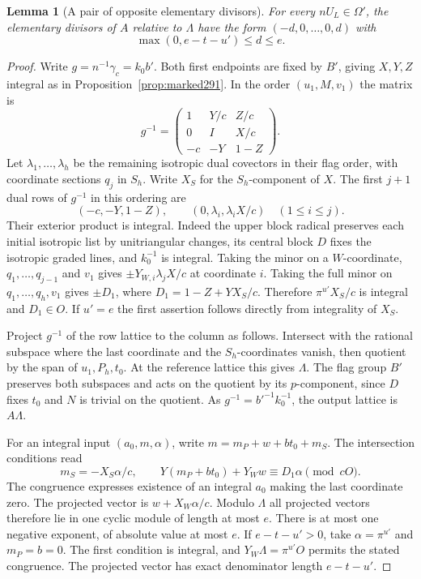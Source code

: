 \documentclass[a4paper,11pt]{article}
\newtheorem{lemma}[proposition]{Lemma}
\theoremstyle{definition}
\theoremstyle{remark}
\numberwithin{equation}{section}
\begin{document}
\begin{lemma}[A pair of opposite elementary divisors]\leavevmode
\label{lem:graphdepth293}
For every \(nU_L\in\Omega'\), the elementary divisors of
\(A\) relative to \(\Lambda\) have the form
\((-d,0,\ldots,0,d)\) with
\[
                \max(0,e-t-u')\le d\le e .
\]
\end{lemma}
\begin{proof}
Write \(g=n^{-1}\gamma_c=k_0 b'\). Both first endpoints
are fixed by \(B'\), giving \(X,Y,Z\) integral as in
Proposition~\ref{prop:marked291}. In the order
\((u_1,M,v_1)\) the matrix is
\[
   g^{-1}=\begin{pmatrix}
       1&Y/c&Z/c\\ 0&I&X/c\\ -c&-Y&1-Z
   \end{pmatrix}.
\]
Let \(\lambda_1,\ldots,\lambda_h\) be the remaining
isotropic dual covectors in their flag order, with
coordinate sections \(q_j\) in \(S_h\). Write \(X_S\)
for the \(S_h\)-component of \(X\). The first \(j+1\)
dual rows of \(g^{-1}\) in this ordering are
\[
 (-c,-Y,1-Z),\qquad (0,\lambda_i,\lambda_i X/c)
                       \quad (1\le i\le j).
\]
Their exterior product is integral. Indeed the upper
block radical preserves each initial isotropic list by
unitriangular changes, its central block \(D\) fixes the
isotropic graded lines, and \(k_0^{-1}\) is integral.
Taking the minor on a \(W\)-coordinate, \(q_1,\ldots,q_{j-1}\)
and \(v_1\) gives \(\pm Y_{W,i}\lambda_j X/c\) at
coordinate \(i\). Taking the full minor on
\(q_1,\ldots,q_h,v_1\) gives \(\pm D_1\), where
\(D_1=1-Z+Y X_S/c\). Therefore
\(\pi^{u'}X_S/c\) is integral and \(D_1\in O\). If
\(u'=e\) the first assertion follows directly from
integrality of \(X_S\).

Project \(g^{-1}\) of the row lattice to the column as
follows. Intersect with the rational subspace where the
last coordinate and the \(S_h\)-coordinates vanish, then
quotient by the span of \(u_1,P_h,t_0\). At the reference
lattice this gives \(\Lambda\). The flag group \(B'\)
preserves both subspaces and acts on the quotient by its
\(p\)-component, since \(D\) fixes \(t_0\) and \(N\) is
trivial on the quotient. As \(g^{-1}=b'^{-1}k_0^{-1}\),
the output lattice is \(A\Lambda\).

For an integral input \((a_0,m,\alpha)\), write
\(m=m_P+w+bt_0+m_S\). The intersection conditions read
\[
 m_S=-X_S\alpha/c,\qquad
 Y(m_P+bt_0)+Y_Ww\equiv D_1\alpha\pmod {cO}.
\]
The congruence expresses existence of an integral \(a_0\)
making the last coordinate zero. The projected vector is
\(w+X_W\alpha/c\). Modulo \(\Lambda\) all projected vectors
therefore lie in one cyclic module of length at most \(e\).
There is at most one negative exponent, of absolute value
at most \(e\). If \(e-t-u'>0\), take \(\alpha=\pi^{u'}\)
and \(m_P=b=0\). The first condition is integral, and
\(Y_W\Lambda=\pi^{u'}O\) permits the stated congruence.
The projected vector has exact denominator length
\(e-t-u'\).


\end{proof}
\end{document}
